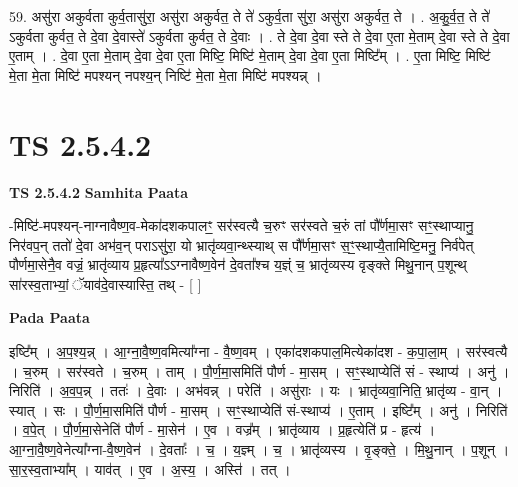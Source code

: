 \documentclass[17pt]{extarticle}
\begin{document}
59. असु॑रा अकुर्वता कुर्व॒तासु॑रा॒ असु॑रा अकुर्वत॒ ते ते॑ ऽकुर्व॒ता सु॑रा॒ असु॑रा अकुर्वत॒ ते । . अ॒कु॒र्व॒त॒ ते ते॑ ऽकुर्वता कुर्वत॒ ते दे॒वा दे॒वास्ते॑ ऽकुर्वता कुर्वत॒ ते दे॒वाः । . ते दे॒वा दे॒वा स्ते ते दे॒वा ए॒ता मे॒ताम् दे॒वा स्ते ते दे॒वा ए॒ताम् । . दे॒वा ए॒ता मे॒ताम् दे॒वा दे॒वा ए॒ता मिष्टि॒ मिष्टि॑ मे॒ताम् दे॒वा दे॒वा ए॒ता मिष्टि᳚म् । . ए॒ता मिष्टि॒ मिष्टि॑ मे॒ता मे॒ता मिष्टि॑ मपश्यन् नपश्य॒न् निष्टि॑ मे॒ता मे॒ता मिष्टि॑ मपश्यन्न् । \newline
\pagebreak
{}

\section{ TS 2.5.4.2 }

\textbf{TS 2.5.4.2 } \newline
\textbf{Samhita Paata} \newline

-मिष्टि॑-मपश्यन्-नाग्नावैष्ण॒व-मेका॑दशकपालꣳ॒॒ सर॑स्वत्यै च॒रुꣳ सर॑स्वते च॒रुं तां पौ᳚र्णमा॒सꣳ सꣳ॒॒स्थाप्यानु॒ निर॑वप॒न् ततो॑ दे॒वा अभ॑व॒न् पराऽसु॑रा॒ यो भ्रातृ॑व्यवा॒न्थ्स्याथ् स पौ᳚र्णमा॒सꣳ स॒ꣳ॒॒स्थाप्यै॒तामिष्टि॒मनु॒ निर्व॑पेत् पौर्णमा॒सेनै॒व वज्रं॒ भ्रातृ॑व्याय प्र॒हृत्या᳚ऽऽग्नावैष्ण॒वेन॑ दे॒वता᳚श्च य॒ज्ञ्ं च॒ भ्रातृ॑व्यस्य वृङ्क्ते मिथु॒नान् प॒शून्थ् सा॑रस्व॒ताभ्यां॒ ॅयाव॑दे॒वास्यास्ति॒ तथ् - [  ] \newline

\textbf{Pada Paata} \newline

इष्टि᳚म् । अ॒प॒श्य॒न्न् । आ॒ग्ना॒वै॒ष्ण॒वमित्या᳚ग्ना - वै॒ष्ण॒वम् । एका॑दशकपाल॒मित्येका॑दश - क॒पा॒ला॒म् । सर॑स्वत्यै । च॒रुम् । सर॑स्वते । च॒रुम् । ताम् । पौ॒र्ण॒मा॒समिति॑ पौर्ण - मा॒सम् । सꣳ॒॒स्थाप्येति॑ सं - स्थाप्य॑ । अनु॑ । निरिति॑ । अ॒व॒प॒न्न् । ततः॑ । दे॒वाः । अभ॑वन्न् । परेति॑ । असु॑राः । यः । भ्रातृ॑व्यवा॒निति॒ भ्रातृ॑व्य - वा॒न् । स्यात् । सः । पौ॒र्ण॒मा॒समिति॑ पौर्ण - मा॒सम् । सꣳ॒॒स्थाप्येति॑ सं-स्थाप्य॑ । ए॒ताम् । इष्टि᳚म् । अनु॑ । निरिति॑ । व॒पे॒त् । पौ॒र्ण॒मा॒सेनेति॑ पौर्ण - मा॒सेन॑ । ए॒व । वज्र᳚म् । भ्रातृ॑व्याय । प्र॒हृत्येति॑ प्र - हृत्य॑ । आ॒ग्ना॒वै॒ष्ण॒वेनेत्या᳚ग्ना-वै॒ष्ण॒वेन॑ । दे॒वताः᳚ । च॒ । य॒ज्ञ्म् । च॒ । भ्रातृ॑व्यस्य । वृ॒ङ्क्ते॒ । मि॒थु॒नान् । प॒शून् । सा॒र॒स्व॒ताभ्या᳚म् । याव॑त् । ए॒व । अ॒स्य॒ । अस्ति॑ । तत् ।  \newline
\end{document}
